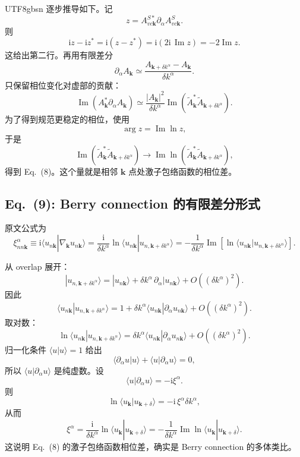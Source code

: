 \documentclass[11pt,a4paper]{article}
\newcommand{\ii}{\mathrm{i}}
\newcommand{\Impart}{\operatorname{Im}}
\begin{document}
\begin{CJK}{UTF8}{gbsn}
逐步推导如下。记
\[
z=A^{S*}_{vc\bm k}\partial_\alpha A^S_{vc\bm k}.
\]
则
\[
\ii z-\ii z^*
=\ii(z-z^*)
=\ii(2\ii\,\Impart z)
=-2\Impart z.
\]
这给出第二行。再用有限差分
\[
\partial_\alpha A_{\bm k}
\simeq
\frac{A_{\bm k+\delta k^\alpha}-A_{\bm k}}{\delta k^\alpha}.
\]
只保留相位变化对虚部的贡献：
\[
\Impart\left(A^*_{\bm k}\partial_\alpha A_{\bm k}\right)
\simeq
\frac{|A_{\bm k}|^2}{\delta k^\alpha}
\Impart\left(
\widetilde A^*_{\bm k}
\widetilde A_{\bm k+\delta k^\alpha}
\right).
\]
为了得到规范更稳定的相位，使用
\[
\arg z=\Impart\ln z,
\]
于是
\[
\Impart\left(
\widetilde A^*_{\bm k}
\widetilde A_{\bm k+\delta k^\alpha}
\right)
\longrightarrow
\Impart\ln\left(
\widetilde A^*_{\bm k}
\widetilde A_{\bm k+\delta k^\alpha}
\right),
\]
得到 Eq.~(8)。这个量就是相邻 $\bm k$ 点处激子包络函数的相位差。

\subsection*{Eq.~(9): Berry connection 的有限差分形式}

原文公式为
\begin{equation}
\xi^\alpha_{nn\bm k}
\equiv
\ii\langle u_{n\bm k}|\nabla_{\bm k}u_{n\bm k}\rangle
=\frac{\ii}{\delta k^\alpha}
\ln\langle u_{n\bm k}|u_{n,\bm k+\delta k^\alpha}\rangle
=-\frac{1}{\delta k^\alpha}
\Impart\left[
\ln\langle u_{n\bm k}|u_{n,\bm k+\delta k^\alpha}\rangle
\right].
\tag{9}
\end{equation}

从 overlap 展开：
\[
|u_{n,\bm k+\delta k^\alpha}\rangle
=|u_{n\bm k}\rangle
+\delta k^\alpha\,\partial_\alpha|u_{n\bm k}\rangle
+O((\delta k^\alpha)^2).
\]
因此
\[
\langle u_{n\bm k}|u_{n,\bm k+\delta k^\alpha}\rangle
=1+\delta k^\alpha
\langle u_{n\bm k}|\partial_\alpha u_{n\bm k}\rangle
+O((\delta k^\alpha)^2).
\]
取对数：
\[
\ln\langle u_{n\bm k}|u_{n,\bm k+\delta k^\alpha}\rangle
=\delta k^\alpha
\langle u_{n\bm k}|\partial_\alpha u_{n\bm k}\rangle
+O((\delta k^\alpha)^2).
\]
归一化条件 $\langle u|u\rangle=1$ 给出
\[
\langle \partial_\alpha u|u\rangle
+\langle u|\partial_\alpha u\rangle=0,
\]
所以 $\langle u|\partial_\alpha u\rangle$ 是纯虚数。设
\[
\langle u|\partial_\alpha u\rangle=-\ii\xi^\alpha.
\]
则
\[
\ln\langle u_{\bm k}|u_{\bm k+\delta}\rangle
=-\ii\,\xi^\alpha\delta k^\alpha,
\]
从而
\[
\xi^\alpha
=\frac{\ii}{\delta k^\alpha}
\ln\langle u_{\bm k}|u_{\bm k+\delta}\rangle
=-\frac{1}{\delta k^\alpha}
\Impart\ln\langle u_{\bm k}|u_{\bm k+\delta}\rangle.
\]
这说明 Eq.~(8) 的激子包络函数相位差，确实是 Berry connection 的多体类比。


\end{CJK}
\end{document}
